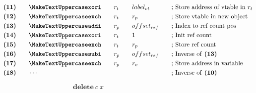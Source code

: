 \begin{figure}[ht]
\begin{subfigure}[t]{0.495\linewidth}
{\begin{minipage}{\linewidth}
\begin{alignat*}{5}
                    &\textbf{(11)}\quad&&\inst{xori}\quad && r_t\quad && label_{vt} &&\text{; Store address of vtable in $r_t$}\\
                    &\textbf{(12)}\quad&&\inst{exch}\quad && r_t\quad && r_p\quad &&\text{; Store vtable in new object}\\
                    &\textbf{(13)}\quad&&\inst{addi}\quad && r_p\quad && offset_{ref}\quad &&\text{; Index to ref count pos}\\
                    &\textbf{(14)}\quad&&\inst{xori}\quad && r_t\quad && 1 &&\text{; Init ref count}\\
                    &\textbf{(15)}\quad&&\inst{exch}\quad && r_t\quad && r_p\quad &&\text{; Store ref count}\\
                    &\textbf{(16)}\quad&&\inst{subi}\quad && r_p\quad && offset_{ref}\quad &&\text{; Inverse of \textbf{(13)}}\\
                    &\textbf{(17)}\quad&&\inst{exch}\quad && r_p\quad && r_v\quad &&\text{; Store address in variable}\\
                    &\textbf{(18)}\quad&&\cdots\quad &&\quad && &&\text{; Inverse of \textbf{(10)}}\\
                \end{alignat*}
            \end{minipage}
        }
    \end{subfigure}
    \begin{subfigure}[t]{0.495\linewidth}
        \vskip 0pt
        \centering
        \begin{equation*}
            \textbf{delete}\ c\ x
        \end{equation*}
\end{subfigure}
\end{figure}
